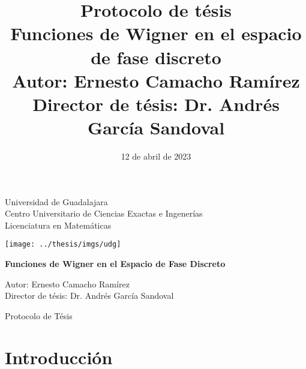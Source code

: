 \documentclass[a4paper]{article}
\title{
  \Large Protocolo de tésis\\[1in]
  \huge Funciones de Wigner en el espacio de
  fase discreto\\[1in]
  \large \textbf{Autor}: Ernesto Camacho Ramírez\\
  \textbf{Director de tésis}: Dr. Andrés García Sandoval
}
\date{12 de abril de 2023}
\author{}
\begin{document}
  \begin{titlepage}
    \begin{center}
      \vspace{1.0in}

      \huge
      Universidad de Guadalajara\\
      \vspace{0.2cm}
      \large
      Centro Universitario de Ciencias Exactas e Ingenerías\\
      Licenciatura en Matemáticas\\

      \vspace{0.5in}

      \texttt{[image: ../thesis/imgs/udg]}
      
      \vspace{0.5in}

      \huge
      \textbf{
        Funciones de Wigner en el Espacio de Fase Discreto
      }

      \large
      \vspace{1.0in}
      
      Autor: Ernesto Camacho Ramírez \\
      \vspace{0.2cm}
      Director de tésis: Dr. Andrés García Sandoval \\

      \vfill
           
      \Large Protocolo de Tésis
     \end{center}
  \end{titlepage}


  \newpage
  \section{Introducción}
\end{document}
